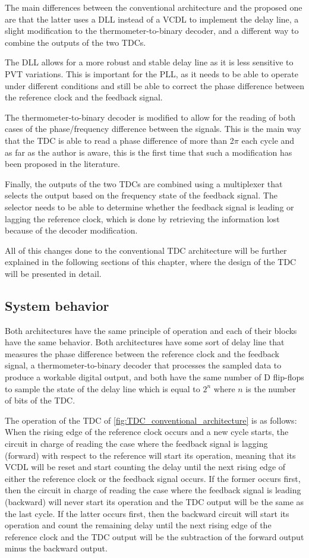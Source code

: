 The main differences between the conventional architecture and the proposed one are that the latter uses a DLL instead of a VCDL to implement the delay line, a slight modification
to the thermometer-to-binary decoder, and a different way to combine the outputs of the two TDCs.

The DLL allows for a more robust and stable delay line as it is less sensitive to PVT variations. This is important for the PLL, as it needs to be able to operate under different
conditions and still be able to correct the phase difference between the reference clock and the feedback signal.

The thermometer-to-binary decoder is modified to allow for the reading of both cases of the phase/frequency difference between the signals. This is the main way that the TDC is able
to read a phase difference of more than 2$\pi$ each cycle and as far as the author is aware, this is the first time that such a modification has been proposed in the literature.

Finally, the outputs of the two TDCs are combined using a multiplexer that selects the output based on the frequency state of the feedback signal. The selector needs to be able to
determine whether the feedback signal is leading or lagging the reference clock, which is done by retrieving the information lost because of the decoder modification.


All of this changes done to the conventional TDC architecture will be further explained in the following sections of this chapter, where the design of the TDC will be presented in 
detail.

\subsection{System behavior}
Both architectures have the same principle of operation and each of their blocks have the same behavior. Both architectures have some sort of delay line that measures the phase difference
between the reference clock and the feedback signal, a thermometer-to-binary decoder that processes the sampled data to produce a workable digital output, and both have the same number of 
D flip-flops to sample the state of the delay line which is equal to $2^n$ where $n$ is the number of bits of the TDC.

The operation of the TDC of \ref{fig:TDC_conventional_architecture} is as follows: When the rising edge of the reference clock occurs and a new cycle starts, the circuit in charge of reading the 
case where the feedback signal is lagging (forward) with respect to the reference will start its operation, meaning that its VCDL will be reset and start counting the delay until the next rising 
edge of either the reference clock or the feedback signal occurs. If the former occurs first, then the circuit in charge of reading the case where the feedback signal is leading (backward) will 
never start its operation and the TDC output will be the same as the last cycle. If the latter occurs first, then the backward circuit will start its operation and count the remaining delay until
the next rising edge of the reference clock and the TDC output will be the subtraction of the forward output minus the backward output.

